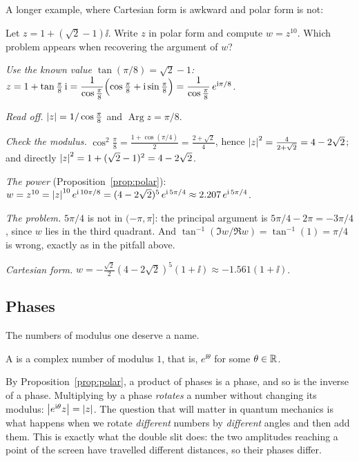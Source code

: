 A longer example, where Cartesian form is awkward and polar form is not:

\begin{example}\label{ex:z10}
  Let $z=1+(\sqrt2-1)\ii$. Write $z$ in polar form and compute $w=z^{10}$. Which problem appears when recovering the argument of $w$?
\end{example}
\begin{solution}
  \begin{steps}
    \item \emph{Use the known value $\tan(\pi/8)=\sqrt2-1$:} $z=1+\tan\tfrac\pi8\,\mathrm{i}=\dfrac1{\cos\frac\pi8}\Bigl(\cos\tfrac\pi8+\mathrm{i}\sin\tfrac\pi8\Bigr)=\dfrac{1}{\cos\frac\pi8}\,e^{\mathrm{i}\pi/8}$.
    \item \emph{Read off.} $\left|z\right|=1/\cos\frac\pi8$ and $\operatorname{Arg}z=\pi/8$.
    \item \emph{Check the modulus.} $\cos^2\frac\pi8=\frac{1+\cos(\pi/4)}{2}=\frac{2+\sqrt2}{4}$, hence $\left|z\right|^2=\frac4{2+\sqrt2}=4-2\sqrt2$; and directly $\left|z\right|^2=1+(\sqrt2-1)^2=4-2\sqrt2$.
    \item \emph{The power} (Proposition~\ref{prop:polar}): $w=z^{10}=\left|z\right|^{10}e^{\mathrm{i}\,10\pi/8}=(4-2\sqrt2)^5\,e^{\mathrm{i}\,5\pi/4}\approx2.207\,e^{\mathrm{i}\,5\pi/4}$.
    \item \emph{The problem.} $5\pi/4$ is not in $(-\pi,\pi]$: the principal argument is $5\pi/4-2\pi=-3\pi/4$, since $w$ lies in the third quadrant. And $\tan^{-1}(\Im w/\Re w)=\tan^{-1}(1)=\pi/4$ is wrong, exactly as in the pitfall above.
    \item \emph{Cartesian form.} $w=-\tfrac{\sqrt2}{2}(4-2\sqrt2)^5(1+\ii)\approx-1.561(1+\ii)$.
  \end{steps}
\end{solution}

\subsection{Phases}

The numbers of modulus one deserve a name.

\begin{definition}[Phase]\label{def:phase}
  A  is a complex number of modulus $1$, that is, $e^{\ii\theta}$ for some $\theta\in\mathbb{R}$.
\end{definition}

By Proposition~\ref{prop:polar}, a product of phases is a phase, and so is the inverse of a phase. Multiplying by a phase \emph{rotates} a number without changing its modulus: $\left|e^{\mathrm{i}\theta}z\right|=\left|z\right|$. The question that will matter in quantum mechanics is what happens when we rotate \emph{different} numbers by \emph{different} angles and then add them. This is exactly what the double slit does: the two amplitudes reaching a point of the screen have travelled different distances, so their phases differ.

